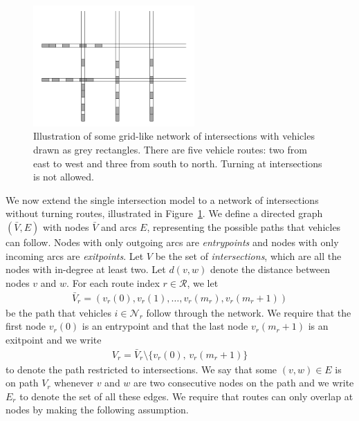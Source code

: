\documentclass[a4paper]{article}
\theoremstyle{definition}
\theoremstyle{plain}
\begin{document}
\begin{figure}
  \centering
  \includegraphics[width=0.55\textwidth]{figures/network/grid_example.png}
  \caption{Illustration of some grid-like network of intersections with vehicles
    drawn as grey rectangles. There are five vehicle routes: two from east to
    west and three from south to north. Turning at intersections is not
    allowed.}\label{fig:network_illustration}
\end{figure}

We now extend the single intersection model to a network of intersections
without turning routes, illustrated in Figure~\ref{fig:network_illustration}.
We define a directed graph $(\bar{V},E)$ with nodes $\bar{V}$ and arcs $E$,
representing the possible paths that vehicles can follow. Nodes with only
outgoing arcs are \textit{entrypoints} and nodes with only incoming arcs are \textit{exitpoints}.
Let $V$ be the set of \textit{intersections}, which are all the nodes with
in-degree at least two.
%
Let $d(v, w)$ denote the distance between nodes $v$ and $w$.
%
For each route index $r \in \mathcal{R}$, we let
\begin{align*}
  \bar{V}_{r} = (v_{r}(0), v_{r}(1), \dots, v_{r}(m_{r}), v_{r}(m_{r}+1))
\end{align*}
be the path that vehicles $i \in \mathcal{N}_{r}$ follow through the network. We
require that the first node $v_{r}(0)$ is an entrypoint and that the last node
$v_{r}(m_{r}+1)$ is an exitpoint and we write
\begin{align*}
  V_{r} = \bar{V}_{r} \setminus \{ v_{r}(0), \, v_{r}(m_{r}+1) \}
\end{align*}
to denote the path restricted to intersections. We say that some $(v, w) \in E$
is on path $V_{r}$ whenever $v$ and $w$ are two consecutive nodes on the path
and we write $E_{r}$ to denote the set of all these edges. We require that
routes can only overlap at nodes by making the following assumption.
\end{document}
